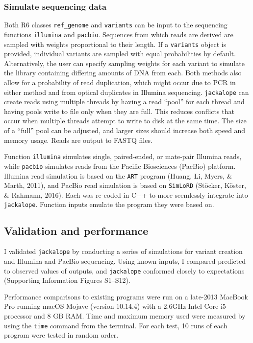 \documentclass[12pt,]{article}
\begin{document}
\hypertarget{simulate-sequencing-data}{%
\subsubsection{Simulate sequencing data}\label{simulate-sequencing-data}}

Both R6 classes \texttt{ref\_genome} and \texttt{variants} can be input to the sequencing functions
\texttt{illumina} and \texttt{pacbio}.
Sequences from which reads are derived are sampled with weights proportional to
their length.
If a \texttt{variants} object is provided, individual variants are sampled with equal
probabilities by default.
Alternatively, the user can specify sampling weights for each variant
to simulate the library containing differing amounts of DNA from each.
Both methods also allow for a probability of read duplication, which might occur
due to PCR in either method and from optical duplicates in Illumina sequencing.
\texttt{jackalope} can create reads using multiple threads by having a read ``pool'' for
each thread and having pools write to file only when they are full.
This reduces conflicts that occur when multiple threads attempt to write to disk
at the same time.
The size of a ``full'' pool can be adjusted, and larger sizes should increase both
speed and memory usage.
Reads are output to FASTQ files.

Function \texttt{illumina} simulates single, paired-ended, or mate-pair Illumina reads,
while \texttt{pacbio} simulates reads from the Pacific Biosciences (PacBio) platform.
Illumina read simulation is based on the \texttt{ART} program
(Huang, Li, Myers, \& Marth, 2011), and
PacBio read simulation is based on \texttt{SimLoRD}
(Stöcker, Köster, \& Rahmann, 2016).
Each was re-coded in C++ to more seemlessly integrate into \texttt{jackalope}.
Function inputs emulate the program they were based on.

\hypertarget{validation-and-performance}{%
\subsection{Validation and performance}\label{validation-and-performance}}

I validated \texttt{jackalope} by conducting a series of simulations for variant creation
and Illumina and PacBio sequencing.
Using known inputs, I compared predicted to observed values of outputs,
and \texttt{jackalope} conformed closely to expectations
(Supporting Information Figures S1--S12).

Performance comparisons to existing programs were run on a late-2013 MacBook
Pro running macOS Mojave (version 10.14.4) with a 2.6GHz Intel Core i5 processor
and 8 GB RAM.
Time and maximum memory used were measured by using the \texttt{time} command from the terminal.
For each test, 10 runs of each program were tested in random order.
\end{document}

